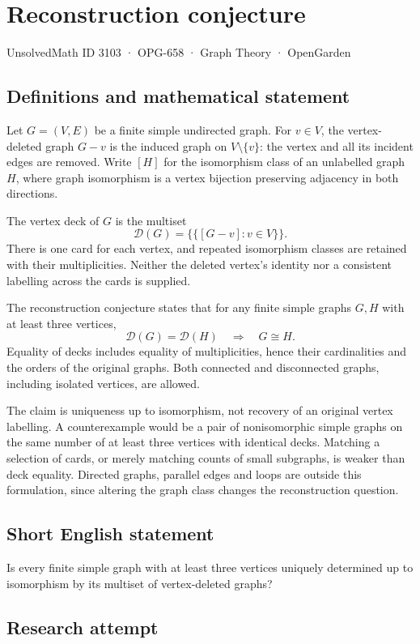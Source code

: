 \documentclass[11pt,a4paper]{article}
\begin{document}
\section*{Reconstruction conjecture}\label{3103}
{\small UnsolvedMath ID 3103 · OPG-658 · Graph Theory · OpenGarden}
\subsection{Definitions and mathematical statement}
Let $G=(V,E)$ be a finite simple undirected graph. For $v\in V$, the
vertex-deleted graph $G-v$ is the induced graph on $V\setminus\{v\}$:
the vertex and all its incident edges are removed. Write $[H]$ for the
isomorphism class of an unlabelled graph $H$, where graph isomorphism is
a vertex bijection preserving adjacency in both directions.

The vertex deck of $G$ is the multiset
\[
 \mathcal D(G)=\{\!\{[G-v]:v\in V\}\!\}.
\]
There is one card for each vertex, and repeated isomorphism classes are
retained with their multiplicities. Neither the deleted vertex's identity
nor a consistent labelling across the cards is supplied.

The reconstruction conjecture states that for any finite simple graphs
$G,H$ with at least three vertices,
\[
 \mathcal D(G)=\mathcal D(H)\quad\Longrightarrow\quad G\cong H.
\]
Equality of decks includes equality of multiplicities, hence their
cardinalities and the orders of the original graphs. Both connected and
disconnected graphs, including isolated vertices, are allowed.

The claim is uniqueness up to isomorphism, not recovery of an original
vertex labelling. A counterexample would be a pair of nonisomorphic
simple graphs on the same number of at least three vertices with identical
decks. Matching a selection of cards, or merely matching counts of small
subgraphs, is weaker than deck equality. Directed graphs, parallel edges
and loops are outside this formulation, since altering the graph class
changes the reconstruction question.
\subsection{Short English statement}
Is every finite simple graph with at least three vertices uniquely determined up to isomorphism by its multiset of vertex-deleted graphs?
\subsection{Research attempt}
\end{document}
